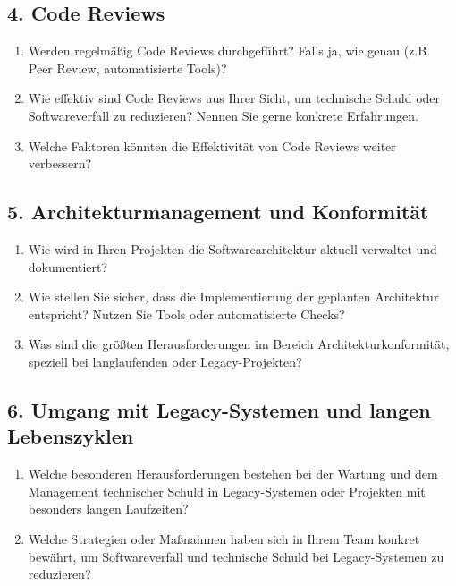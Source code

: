 \subsection*{4. Code Reviews}

\begin{enumerate}[resume]
    \item Werden regelmäßig Code Reviews durchgeführt? Falls ja, wie genau (z.B. Peer Review, automatisierte Tools)?
    \item Wie effektiv sind Code Reviews aus Ihrer Sicht, um technische Schuld oder Softwareverfall zu reduzieren? Nennen Sie gerne konkrete Erfahrungen.
    \item Welche Faktoren könnten die Effektivität von Code Reviews weiter verbessern?
\end{enumerate}

\subsection*{5. Architekturmanagement und Konformität}

\begin{enumerate}[resume]
    \item Wie wird in Ihren Projekten die Softwarearchitektur aktuell verwaltet und dokumentiert?
    \item Wie stellen Sie sicher, dass die Implementierung der geplanten Architektur entspricht? Nutzen Sie Tools oder automatisierte Checks?
    \item Was sind die größten Herausforderungen im Bereich Architekturkonformität, speziell bei langlaufenden oder Legacy-Projekten?
\end{enumerate}

\subsection*{6. Umgang mit Legacy-Systemen und langen Lebenszyklen}

\begin{enumerate}[resume]
    \item Welche besonderen Herausforderungen bestehen bei der Wartung und dem Management technischer Schuld in Legacy-Systemen oder Projekten mit besonders langen Laufzeiten?
    \item Welche Strategien oder Maßnahmen haben sich in Ihrem Team konkret bewährt, um Softwareverfall und technische Schuld bei Legacy-Systemen zu reduzieren?
\end{enumerate}

